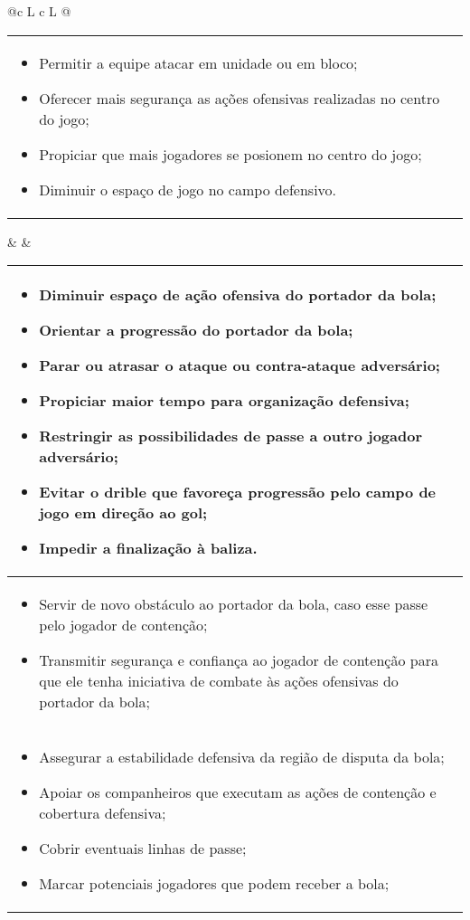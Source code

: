 \documentclass{article}
\begin{document}
\begin{table}
\begin{tabularx}{\linewidth}{@{}c L c L @{}}
\begin{tabular}[b]{@{}>{\centering\arraybackslash}p{\linewidth}@{}}
\begin{itemize}
				\item Permitir a equipe atacar em unidade ou em bloco;
				\item Oferecer mais segurança as ações ofensivas realizadas no centro do jogo;
				\item Propiciar que mais jogadores se posionem no centro do jogo;
				\item Diminuir o espaço de jogo no campo defensivo.
			\end{itemize}
		\end{tabular}
		&   &   \begin{tabular}[b]{@{}>{\centering\arraybackslash}p{\linewidth}@{}}
			\thead{Contenção}                                         
			\begin{itemize}
				\item Diminuir espaço de ação ofensiva do portador da bola;
				\item Orientar a progressão do portador da bola;
				\item Parar ou atrasar o ataque ou contra-ataque adversário;
				\item Propiciar maior tempo para organização defensiva;
				\item Restringir as possibilidades de passe a outro jogador adversário;
				\item Evitar o drible que favoreça progressão pelo campo de jogo em direção ao gol;
				\item Impedir a finalização à baliza.
			\end{itemize}    \\
			\midrule
			\thead{Cobertura defensiva}
			\begin{itemize}
				\item Servir de novo obstáculo ao portador da bola, caso esse passe pelo jogador de contenção;
				\item Transmitir segurança e confiança ao jogador de contenção para que ele tenha iniciativa de combate às ações ofensivas do portador da bola;
			\end{itemize}    \\
			\midrule
			\thead{Equilíbrio}
			\begin{itemize}
				\item Assegurar a estabilidade defensiva da região de disputa da bola;
				\item Apoiar os companheiros que executam as ações de contenção e cobertura defensiva;
				\item Cobrir eventuais linhas de passe;
				\item Marcar potenciais jogadores que podem receber a bola;

\end{itemize}
\end{tabular}
\end{tabularx}
\end{table}
\end{document}
